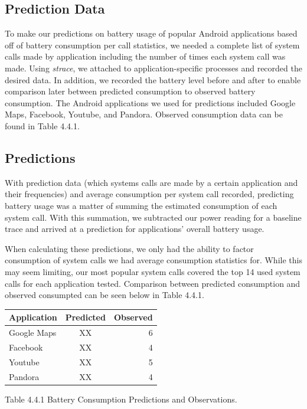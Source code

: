 \documentclass[11pt]{article}
\begin{document}
\subsection{Prediction Data}

To make our predictions on battery usage of popular Android applications based off of battery consumption per call statistics,
we needed a complete list of system calls made by application including the number of times each system call was made.  Using
\textit{strace}, we attached to application-specific processes and recorded the desired data. In addition, we recorded the battery level 
before and after to enable comparison later between predicted consumption to observed battery consumption.  The Android 
applications we used for predictions included Google Maps, Facebook, Youtube, and Pandora.  Observed consumption 
data can be found in Table 4.4.1.

\subsection{Predictions}

With prediction data (which systems calls are made by a certain application and their frequencies) and average consumption per
system call recorded, predicting battery usage was a matter of summing the estimated consumption of each system call.  With this summation,
we subtracted our power reading for a baseline trace and arrived at a prediction for applications' overall battery usage.

When calculating these predictions, we only had the ability to factor consumption of system calls we had average consumption statistics for.  
While this may seem limiting, our most popular system calls covered the top 14 used system calls for each application tested.  Comparison 
between predicted consumption and observed consumpted can be seen below in Table 4.4.1.

\begin{tabular}{l c r}
   Application & Predicted & Observed \\
   \hline
   Google Maps & XX & 6 \\
   Facebook & XX & 4 \\
   Youtube & XX & 5 \\
   Pandora & XX & 4 \\
\end{tabular}
\newline        
{\fontsize{11}{13}\selectfont Table 4.4.1 Battery Consumption Predictions and Observations.}
\newline
\end{document}
